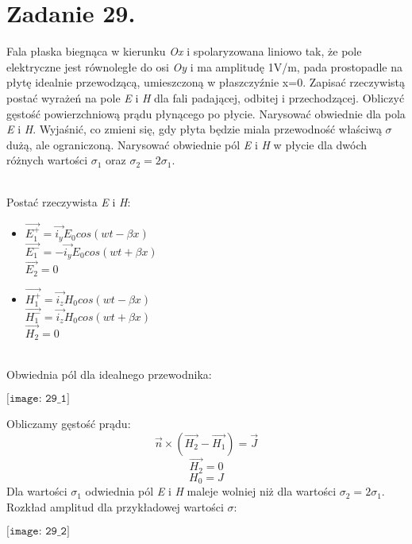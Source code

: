 \section*{Zadanie 29.}
\begin{task}
Fala płaska biegnąca w kierunku \textsl{Ox} i spolaryzowana liniowo tak, że pole elektryczne jest równoległe do
osi \textsl{Oy} i ma amplitudę 1V/m, pada prostopadle na płytę idealnie przewodzącą, umieszczoną w 
płaszczyźnie x=0. Zapisać rzeczywistą postać wyrażeń na pole \textsl{E} i \textsl{H} dla fali padającej,
odbitej i przechodzącej. Obliczyć gęstość powierzchniową prądu płynącego po płycie. Narysować obwiednie dla
pola \textsl{E} i \textsl{H}. Wyjaśnić, co zmieni się, gdy płyta będzie miala przewodność właściwą $\sigma$
dużą, ale ograniczoną. Narysować obwiednie pól \textsl{E} i \textsl{H} w płycie dla dwóch różnych wartości 
$\sigma_{1}$ oraz $\sigma_{2}=2\sigma_{1}$.\\ \\
\end{task}

\begin{solution}
Postać rzeczywista \textsl{E} i \textsl{H}:
\begin{itemize}
\item $\vec{E^{+}_{1}}=\vec{i_{y}}E_{0}cos(wt-\beta x)$\\
       $\vec{E^{-}_{1}}=-\vec{i_{y}}E_{0}cos(wt+\beta x)$\\
       $\vec{E_{2}}=0$
\item $\vec{H^{+}_{1}}=\vec{i_{z}}H_{0}cos(wt-\beta x)$\\
       $\vec{H^{-}_{1}}=\vec{i_{z}}H_{0}cos(wt+\beta x)$\\
       $\vec{H_{2}}=0$\\ \\
\end{itemize}

Obwiednia pól dla idealnego przewodnika:\\
\begin{center}
$\texttt{[image: 29\_1]}$\\
\end{center}

Obliczamy gęstość prądu:
$$\vec{n}\times(\vec{H_{2}} - \vec{H_{1}})=\vec{J}$$
$$\vec{H_{2}} = 0$$
$$H_{0} = J$$
Dla wartości $\sigma_{1}$ odwiednia pól \textsl{E} i \textsl{H} maleje wolniej niż dla wartości
$\sigma_{2}=2\sigma_{1}$.\\
Rozkład amplitud dla przykładowej wartości $\sigma$:
\begin{center}
$\texttt{[image: 29\_2]}$\\
\end{center}

\end{solution}
